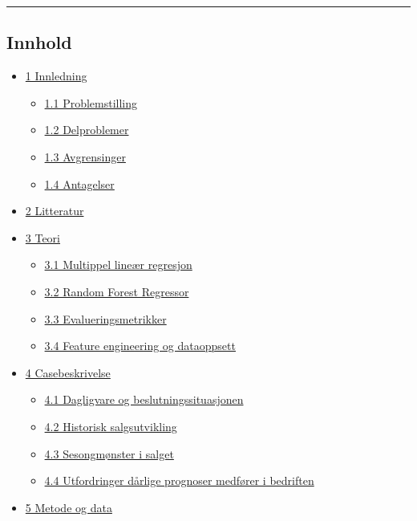 \documentclass[
  11pt,
]{article}
\providecommand{\tightlist}{%
  \setlength{\itemsep}{0pt}\setlength{\parskip}{0pt}}
\begin{document}
\begin{center}\rule{0.5\linewidth}{0.5pt}\end{center}

\hypertarget{innhold}{%
\subsection{\texorpdfstring{Innhold }{Innhold }}\label{innhold}}

\begin{itemize}
\tightlist
\item
  \protect\hyperlink{1-innledning}{1 Innledning}

  \begin{itemize}
  \tightlist
  \item
    \protect\hyperlink{11-problemstilling}{1.1 Problemstilling}
  \item
    \protect\hyperlink{12-delproblemer}{1.2 Delproblemer}
  \item
    \protect\hyperlink{13-avgrensinger}{1.3 Avgrensinger}
  \item
    \protect\hyperlink{14-antagelser}{1.4 Antagelser}
  \end{itemize}
\item
  \protect\hyperlink{2-litteratur}{2 Litteratur}
\item
  \protect\hyperlink{3-teori}{3 Teori}

  \begin{itemize}
  \tightlist
  \item
    \protect\hyperlink{31-multippel-lineuxe6r-regresjon}{3.1 Multippel lineær regresjon}
  \item
    \protect\hyperlink{32-random-forest-regressor}{3.2 Random Forest Regressor}
  \item
    \protect\hyperlink{33-evalueringsmetrikker}{3.3 Evalueringsmetrikker}
  \item
    \protect\hyperlink{34-feature-engineering-og-dataoppsett}{3.4 Feature engineering og dataoppsett}
  \end{itemize}
\item
  \protect\hyperlink{4-casebeskrivelse}{4 Casebeskrivelse}

  \begin{itemize}
  \tightlist
  \item
    \protect\hyperlink{41-dagligvare-og-beslutningssituasjonen}{4.1 Dagligvare og beslutningssituasjonen}
  \item
    \protect\hyperlink{42-historisk-salgsutvikling}{4.2 Historisk salgsutvikling}
  \item
    \protect\hyperlink{43-sesongmuxf8nster-i-salget}{4.3 Sesongmønster i salget}
  \item
    \protect\hyperlink{44-utfordringer-duxe5rlige-prognoser-medfuxf8rer-i-bedriften}{4.4 Utfordringer dårlige prognoser
    medfører i bedriften}
  \end{itemize}
\item
  \protect\hyperlink{5-metode-og-data}{5 Metode og data}


\end{itemize}
\end{document}
